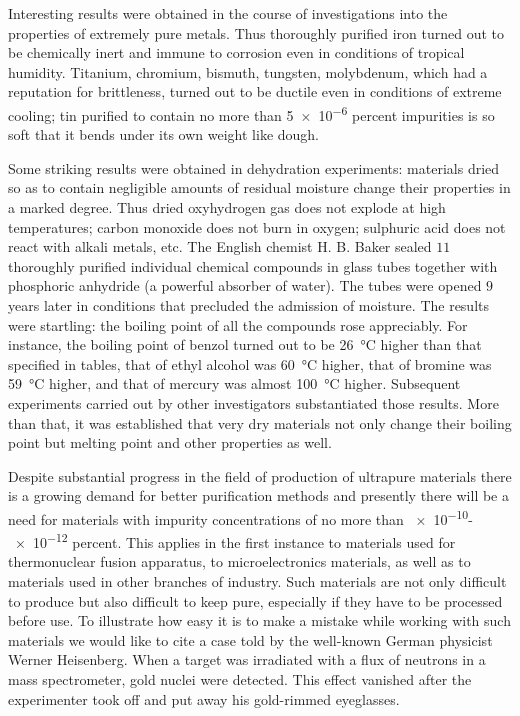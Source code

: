 Interesting results were obtained in the course of investigations into the properties of extremely pure metals. Thus thoroughly purified iron turned out to be chemically inert and immune to corrosion even in conditions of tropical humidity. Titanium, chromium, bismuth, tungsten, molybdenum, which had a reputation for brittleness, turned out to be ductile even in conditions of extreme cooling; tin purified to contain no more than \num{5e-6} percent impurities is so soft that it bends under its own weight like dough.

Some striking results were obtained in dehydration experiments: materials dried so as to contain negligible amounts of residual moisture change their properties in a marked degree. Thus dried oxyhydrogen gas does not explode at high temperatures; carbon monoxide does not burn in oxygen; sulphuric acid does not react with alkali metals, etc. The English chemist H. B. Baker sealed $11$ thoroughly purified individual chemical compounds in glass tubes together with phosphoric anhydride (a powerful absorber of water). The tubes were opened $9$ years later in conditions that precluded the admission of moisture. The results were startling: the boiling point of all the compounds rose appreciably. For instance, the boiling point of benzol turned out to be \SI{26}{\degreeCelsius} higher than that specified in tables, that of ethyl alcohol was \SI{60}{\degreeCelsius} higher, that of bromine was \SI{59}{\degreeCelsius} higher, and that of mercury was almost \SI{100}{\degreeCelsius} higher. Subsequent experiments carried out by other investigators substantiated those results. More than that, it was established that very dry materials not only change their boiling point but melting point and other properties as well.

Despite substantial progress in the field of production of ultrapure materials there is a growing demand for better purification methods and presently there will be a need for materials with impurity concentrations
of no more than \num{e-10}-\num{e-12} percent. This applies in the first instance to materials used for thermonuclear fusion apparatus, to microelectronics materials, as well as to materials used in other branches of industry. Such materials are not only difficult to produce but also difficult to keep pure, especially if they have to be processed before use. To illustrate how easy it is to make a mistake while working with such materials we would like to cite a case told by the well-known German physicist Werner Heisenberg. When a target was irradiated with a flux of neutrons in a mass spectrometer, gold nuclei were detected. This effect vanished after the experimenter took off and put away his gold-rimmed eyeglasses.
